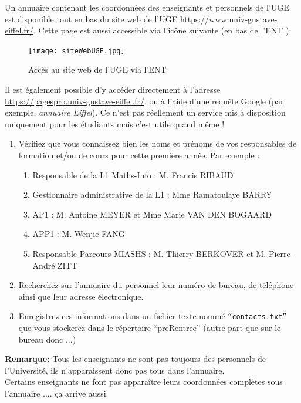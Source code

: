 \documentclass{article}
\begin{document}
\begin{exercice}[Annuaire]

Un annuaire contenant les coordonnées des enseignants et personnels de l'UGE est disponible tout en bas du site web de l'UGE
 \url{https://www.univ-gustave-eiffel.fr/}. Cette page est aussi accessible via l'icône suivante (en bas de l'ENT ):

\begin{figure}[h!]
    \begin{center}
    \texttt{[image: siteWebUGE.jpg]}
    \caption{Accès au site web de l'UGE via l'ENT}
     \end{center}
\end{figure}    

Il est également possible d'y accéder directement à l'adresse
\url{https://pagespro.univ-gustave-eiffel.fr/}, ou à l'aide d'une requête Google (par exemple, \emph{ annuaire Eiffel}). Ce n'est pas réellement un service mis à disposition uniquement pour les étudiants mais c'est utile quand même !

\begin{enumerate}
\item Vérifiez que vous connaissez bien les noms et prénoms de vos responsables de formation et/ou de 
cours pour cette première année. Par exemple : 
  \begin{enumerate}
  	\item Responsable de la L1 Maths-Info : M. Francis RIBAUD
  	\item Gestionnaire administrative de la L1 : Mme Ramatoulaye BARRY   
  	\item AP1 : M. Antoine MEYER et Mme Marie VAN DEN BOGAARD
  	\item APP1 : M. Wenjie FANG
  	\item Responsable Parcours MIASHS : M. Thierry BERKOVER et M. Pierre-André ZITT
   \end{enumerate}     
\item Recherchez sur l'annuaire du personnel leur numéro de bureau, de téléphone ainsi que leur adresse électronique.
\item Enregistrez ces informations dans un fichier texte nommé \texttt{``contacts.txt''} que
   vous stockerez dans le répertoire ``preRentree'' (autre part que sur le bureau donc ...)
\end{enumerate} 

 \textbf{Remarque: }Tous les enseignants ne sont pas toujours des personnels de l'Université,  
  ils n'apparaissent donc pas tous dans l'annuaire.\\
  Certains enseignants ne font pas apparaître leurs coordonnées complètes sous l'annuaire .... \c ca arrive aussi.
 
\end{exercice}
\end{document}
